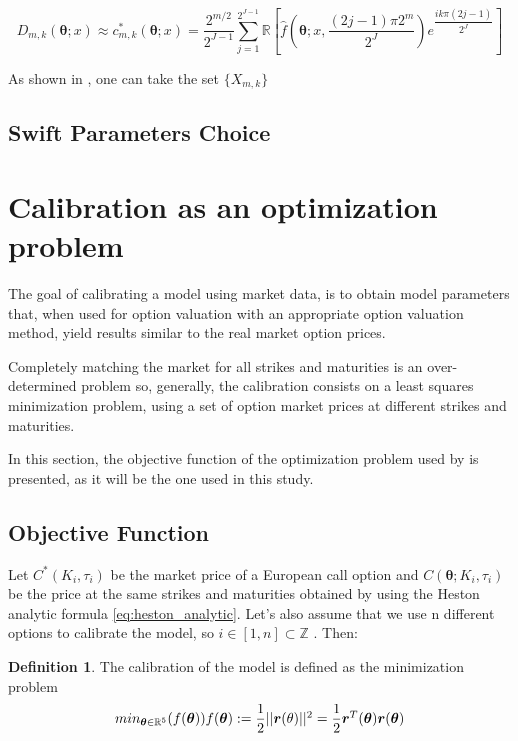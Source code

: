 \documentclass[12,twoside]{mammeTFM}
\theoremstyle{definition}
\newtheorem{definition}[thm]{Definition}
\theoremstyle{remark}
\newcommand{\Z}{\ensuremath{\mathbb{Z}}}
\newcommand{\R}{\ensuremath{\mathbb{R}}}
\begin{document}
\begin{equation}
D_{m,k}(\boldsymbol{\theta}; x) \approx c^*_{m,k} (\boldsymbol{\theta}; x) = \dfrac{2^{m/2}}{2^{J-1}} \sum_{j=1}^{2^{J-1}} \R \left[\hat{f}\left(\boldsymbol{\theta}; x, \dfrac{(2j - 1) \pi 2^m}{2^J}\right) e^{\dfrac{ik\pi(2j-1)}{2^J}}\right] 
\end{equation}

As shown in \cite{ort16}, one can take the set $\{X_{m,k}\}$

\subsection{Swift Parameters Choice}

\section{Calibration as an optimization problem} \label{chap:optimization_problem}
The goal of calibrating a model using market data, is to obtain model parameters that, when used for option valuation with an appropriate option valuation method, yield results similar to the real market option prices.

Completely matching the market for all strikes and maturities is an over-determined problem so, generally, the calibration consists on a least squares minimization problem, using a set of option market prices at different strikes and maturities.

In this section, the objective function of the optimization problem used by \cite{cui17} is presented, as it will be the one used in this study.

\subsection{Objective Function}
Let $C^*(K_i, \tau_i)$ be the market price of a European call option and
 $C(\boldsymbol{\theta}; K_i, \tau_i)$ be the price at the same strikes and maturities obtained by using the Heston analytic formula \ref{eq:heston_analytic}. Let's also assume that we use n different options to calibrate the model, so 
 $i \in [1,n] \subset \Z$
 . Then:
\begin{definition} The calibration of the model is defined as the minimization problem 
\begin{equation} \label{eq:opt_problem}
min_{\boldsymbol{\theta} \in \R^5} (f(\boldsymbol{\theta}))$$ $$f(\boldsymbol{\theta}) := \dfrac{1}{2}||\boldsymbol{r}(\theta)||^2 = \dfrac{1}{2} \boldsymbol{r}^T(\boldsymbol{\theta})\boldsymbol{r}(\boldsymbol{\theta})
\end{equation}
\end{definition}
\end{document}
